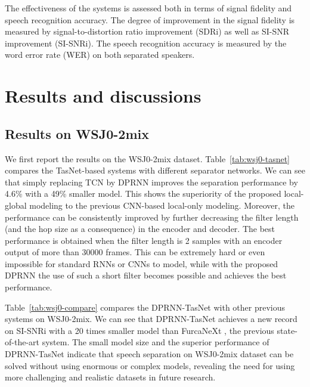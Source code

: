 \documentclass{article}
\begin{document}
The effectiveness of the systems is assessed both in terms of signal fidelity and speech recognition accuracy. The degree of improvement in the signal fidelity is measured by signal-to-distortion ratio improvement (SDRi) \cite{vincent2006performance} as well as SI-SNR improvement (SI-SNRi). The speech recognition accuracy is measured by the word error rate (WER) on both separated speakers. 
\section{Results and discussions}
\label{sec:results}
\subsection{Results on WSJ0-2mix}

We first report the results on the WSJ0-2mix dataset. Table~\ref{tab:wsj0-tasnet} compares the TasNet-based systems with different separator networks. We can see that simply replacing TCN by DPRNN improves the separation performance by 4.6\% with a 49\% smaller model. This shows the superiority of the proposed local-global modeling to the previous CNN-based local-only modeling. Moreover, the performance can be consistently improved by further decreasing the filter length (and the hop size as a consequence) in the encoder and decoder. The best performance is obtained when the filter length is 2 samples with an encoder output of more than 30000 frames. This can be extremely hard or even impossible for standard RNNs or CNNs to model, while with the proposed DPRNN the use of such a short filter becomes possible and achieves the best performance.

Table~\ref{tab:wsj0-compare} compares the DPRNN-TasNet with other previous systems on WSJ0-2mix. We can see that DPRNN-TasNet achieves a new record on SI-SNRi with a 20 times smaller model than FurcaNeXt \cite{shi2019furcanext}, the previous state-of-the-art system. The small model size and the superior performance of DPRNN-TasNet indicate that speech separation on WSJ0-2mix dataset can be solved without using enormous or complex models, revealing the need for using more challenging and realistic datasets in future research.
\end{document}
